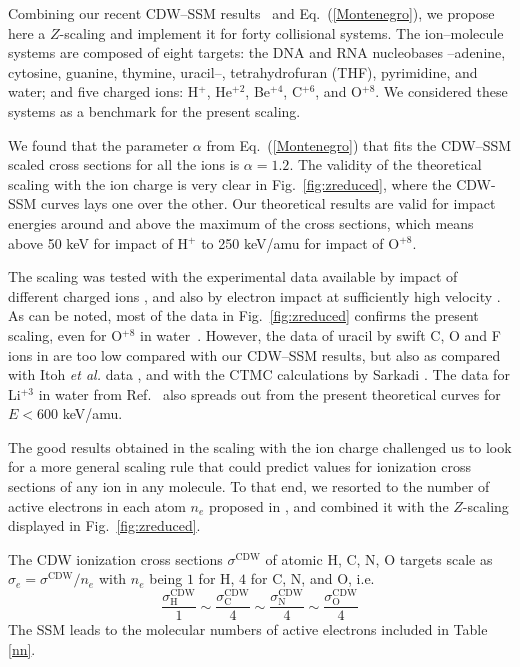 \documentclass[10pt,showpacs,showkeys,twocolumn]{revtex4}
\begin{document}
Combining our recent CDW--SSM results~\cite{MendezJPB20} and Eq.~(\ref{Montenegro}), we propose here a $Z$-scaling and implement it for forty collisional systems. The ion--molecule systems are composed of eight targets: the DNA and RNA nucleobases --adenine, cytosine, guanine, thymine, uracil--, tetrahydrofuran (THF), pyrimidine, and water; and five charged ions: H$^+$, He$^{+2}$, Be$^{+4}$, C$^{+6}$, and O$^{+8}$. We considered these systems as a benchmark for the present scaling. 

We found that the parameter $\alpha$ from Eq.~(\ref{Montenegro}) that fits the CDW--SSM scaled cross sections for all the ions is $\alpha=1.2$. 
The validity of the theoretical scaling with the ion charge is very clear in Fig.~\ref{fig:zreduced}, where the CDW-SSM curves lays one over the other.  Our theoretical results are valid for impact energies around and above the maximum of the cross sections, which means above 50 keV for impact of H$^+$  to 250 keV/amu for impact of O$^{+8}$. 

The scaling was tested with the experimental data available by impact of different charged ions \cite{itoh2013,iriki2011,wolff2014,wang2016,tribedi2019,agnihotri2012,agnihotri2013,Luna2007,Rudd86,Rudd85,Luna_Li_water,DalCappello2009,Tribedi_O_water},
and also by electron impact at sufficiently high velocity \cite{rahman2016,bug2017,wolf2019,fuss2009}. As can be noted, most of the data in Fig.~\ref{fig:zreduced} confirms the present scaling, even for O$^{+8}$ in water~\cite{Tribedi_O_water}. However, the data of uracil by swift C, O and F ions in \cite{agnihotri2012,agnihotri2013} are too low compared with our CDW--SSM results, but also as compared with Itoh \textit{et al.} data \cite{itoh2013}, and with the CTMC calculations by Sarkadi \cite{sarkadi2016}.
The data for Li$^{+3}$ in water from Ref.~\cite{Luna_Li_water} also spreads out from the present theoretical curves for $E<600$ keV/amu.

The good results obtained in the scaling with the ion charge challenged us to look for a more general scaling rule that could predict values for ionization cross sections of any ion in any molecule. 
To that end, we resorted to the number of active electrons in each atom $n_e$ proposed in \cite{MendezJPB20}, and combined it with the $Z$-scaling displayed in Fig.~\ref{fig:zreduced}.

The CDW ionization cross sections $\sigma^{\mathrm{CDW}}$ of atomic H, C, N, O targets scale as $\sigma_e=\sigma^{\mathrm{CDW}}/n_e$ with $n_e$ being $1$ for H, $4$ for C, N, and O, i.e.
\begin{equation}
 \frac{\sigma_{\mathrm{H}}^{\mathrm{CDW}}}{1}\sim
 \frac{\sigma_{\mathrm{C}}^{\mathrm{CDW}}}{4}\sim
 \frac{\sigma_{\mathrm{N}}^{\mathrm{CDW}}}{4}\sim
 \frac{\sigma_{\mathrm{O}}^{\mathrm{CDW}}}{4}
\end{equation}
The SSM leads to the molecular numbers of active electrons included in Table \ref{nn}.
\end{document}
